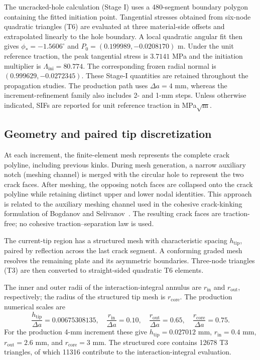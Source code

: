 \documentclass[pdflatex,sn-mathphys-num]{sn-jnl}
\newcommand{\PhiStar}{-1.5606}
\newcommand{\MouthX}{0.199989}
\newcommand{\MouthY}{-0.0208170}
\newcommand{\NormalX}{0.999629}
\newcommand{\NormalY}{-0.0272345}
\newcommand{\PeakStress}{3.7141}
\newcommand{\LoadFactor}{80.774}
\begin{document}
The uncracked-hole calculation (Stage I) uses a 480-segment boundary
polygon containing the fitted initiation point. Tangential stresses
obtained from six-node quadratic triangles (T6) are evaluated at
three material-side offsets and extrapolated linearly to the hole
boundary. A local quadratic angular fit then gives
$\phi_*=\PhiStar^\circ$ and $P_0=(\MouthX,\MouthY)$ m.
Under the unit reference traction, the peak tangential stress is
$\PeakStress$ MPa and the initiation multiplier is
$\Lambda_{\mathrm{ini}}=\LoadFactor$. The corresponding frozen radial
normal is $(\NormalX,\NormalY)$. These Stage-I quantities are retained
throughout the propagation studies. The production path uses
$\Delta a=4$ mm, whereas the increment-refinement family also
includes 2- and 1-mm steps. Unless otherwise indicated, SIFs are
reported for unit reference traction in MPa$\sqrt{\mathrm m}$.

\subsection{Geometry and paired tip discretization}
At each increment, the finite-element mesh represents the complete
crack polyline, including previous kinks. During mesh generation,
a narrow auxiliary notch (meshing channel) is merged with the circular
hole to represent the two crack faces. After meshing, the opposing
notch faces are collapsed onto the crack polyline while retaining
distinct upper and lower nodal identities. This approach is related
to the auxiliary meshing channel used in the cohesive crack-kinking
formulation of Bogdanov and Selivanov~\cite{BogdanovSelivanov2026}.
The resulting crack faces are traction-free; no cohesive
traction--separation law is used.

The current-tip region has a structured mesh with characteristic
spacing $h_{\mathrm{tip}}$, paired by reflection across the last
crack segment. A conforming graded mesh resolves the remaining plate
and its asymmetric boundaries. Three-node triangles (T3) are then
converted to straight-sided quadratic T6 elements.

The inner and outer radii of the interaction-integral annulus are
$r_{\mathrm{in}}$ and $r_{\mathrm{out}}$, respectively; the radius of
the structured tip mesh is $r_{\mathrm{core}}$. The production
numerical scales are
\begin{equation}
 \frac{h_{\mathrm{tip}}}{\Delta a}=0.00675308135,\quad
 \frac{r_{\mathrm{in}}}{\Delta a}=0.10,\quad
 \frac{r_{\mathrm{out}}}{\Delta a}=0.65,\quad
 \frac{r_{\mathrm{core}}}{\Delta a}=0.75.\label{eq:meshscales}
\end{equation}
For the production 4-mm increment these give
$h_{\mathrm{tip}}=0.027012$ mm,
$r_{\mathrm{in}}=0.4$ mm, $r_{\mathrm{out}}=2.6$ mm, and
$r_{\mathrm{core}}=3$ mm. The structured core contains 12678
T3 triangles, of which 11316 contribute to the
interaction-integral evaluation.
\end{document}
